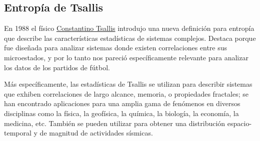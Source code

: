 \subsection{Entropía de Tsallis}
\begin{definicion}\label{def:tsallis_entropy}
En 1988 el físico \href{https://en.wikipedia.org/wiki/Constantino_Tsallis}{Constantino Tsallis} 
introdujo una nueva definición para     entropía que describe las características estadísticas de sistemas 
complejos. Destaca porque fue diseñada para analizar sistemas donde existen correlaciones entre sus 
microestados, y por lo tanto nos pareció específicamente relevante para analizar los datos de los partidos 
de fútbol.\cite{tsallis}

Más específicamente, las estadísticas de Tsallis se utilizan para describir sistemas que exhiben 
correlaciones de largo alcance, memoria,
o propiedades fractales; se han encontrado aplicaciones para una amplia gama de fenómenos en diversos
disciplinas como la física, la geofísica, la química, la biología, la economía, la medicina, etc.\cite{t-ent}
También se pueden utilizar para obtener una distribución espacio-temporal y de magnitud de actividades sísmicas.
\end{definicion}